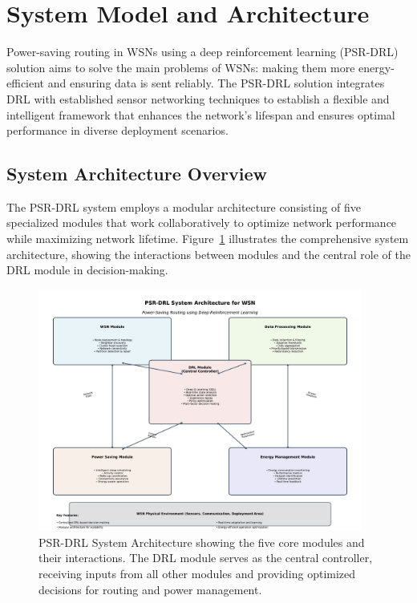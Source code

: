 \section{System Model and Architecture}

Power-saving routing in WSNs using a deep reinforcement learning (PSR-DRL) solution aims to solve the main problems of WSNs: making them more energy-efficient and ensuring data is sent reliably. The PSR-DRL solution integrates DRL with established sensor networking techniques to establish a flexible and intelligent framework that enhances the network's lifespan and ensures optimal performance in diverse deployment scenarios.

\subsection{System Architecture Overview}

The PSR-DRL system employs a modular architecture consisting of five specialized modules that work collaboratively to optimize network performance while maximizing network lifetime. Figure~\ref{fig:psr_drl_architecture} illustrates the comprehensive system architecture, showing the interactions between modules and the central role of the DRL module in decision-making.

\begin{figure}[htbp]
    \centering
    \includegraphics[width=0.95\textwidth]{All figures/PSR_DRL_System_Architecture.pdf}
    \caption{PSR-DRL System Architecture showing the five core modules and their interactions. The DRL module serves as the central controller, receiving inputs from all other modules and providing optimized decisions for routing and power management.}
    \label{fig:psr_drl_architecture}
\end{figure}

